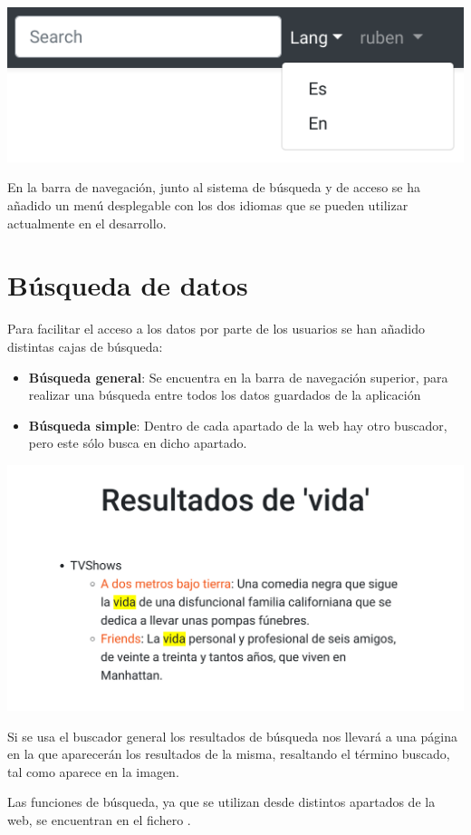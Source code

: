 \documentclass{\ClassPath/viu-tfm-template}
\begin{document}
\begin{center}
    \includegraphics[width=0.5\linewidth]{img/languages.png}
\end{center}

En la barra de navegación, junto al sistema de búsqueda y de acceso se ha añadido un menú desplegable con los dos idiomas que se pueden utilizar actualmente en el desarrollo.


\section{Búsqueda de datos}

Para facilitar el acceso a los datos por parte de los usuarios se han añadido distintas cajas de búsqueda:

\vspace{-1em}
\begin{itemize}
    \item \textbf{Búsqueda general}: Se encuentra en la barra de navegación superior, para realizar una búsqueda entre todos los datos guardados de la aplicación
    \item \textbf{Búsqueda simple}: Dentro de cada apartado de la web hay otro buscador, pero este sólo busca en dicho apartado.
\end{itemize}
\vspace{-1em}

\begin{center}
    \includegraphics[frame,width=0.5\linewidth]{img/buscar.png}
\end{center}

Si se usa el buscador general los resultados de búsqueda nos llevará a una página en la que aparecerán los resultados de la misma, resaltando el término buscado, tal como aparece en la imagen.

Las funciones de búsqueda, ya que se utilizan desde distintos apartados de la web, se encuentran en el fichero .
\end{document}
